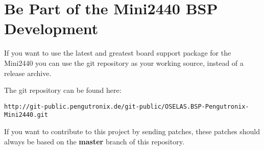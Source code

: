 \section{Be Part of the Mini2440 BSP Development}

If you want to use the latest and greatest board support package for the
Mini2440 you can use the git repository as your working source, instead
of a release archive.

The git repository can be found here:

\begin{center}
\texttt{http://git-public.pengutronix.de/git-public/OSELAS.BSP-Pengutronix-Mini2440.git}
\end{center}

If you want to contribute to this project by sending patches, these patches
should always be based on the \textbf{master} branch of this repository.
